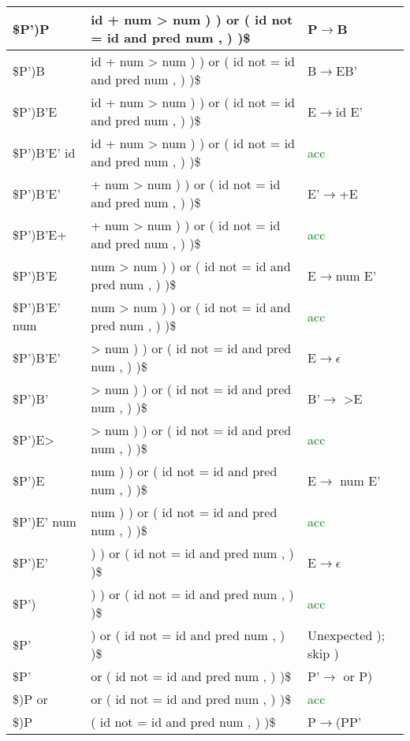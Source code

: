 \documentclass[11pt, a4paper]{article}
\begin{document}
\begin{table}[!ht]
\begin{tabular}{|l|l|l|}
        \$P')P & id + num > num ) ) or ( id not = id and pred num , ) )\$ & P$\rightarrow$B \\ \hline
        \$P')B & id + num > num ) ) or ( id not = id and pred num , ) )\$ & B$\rightarrow$EB' \\ \hline
        \$P')B'E & id + num > num ) ) or ( id not = id and pred num , ) )\$ & E$\rightarrow$id E' \\ \hline
        \$P')B'E' id & id + num > num ) ) or ( id not = id and pred num , ) )\$ & \textcolor{green}{acc} \\ \hline
        \$P')B'E' & + num > num ) ) or ( id not = id and pred num , ) )\$ & E'$\rightarrow$+E \\ \hline
        \$P')B'E+ & + num > num ) ) or ( id not = id and pred num , ) )\$ & \textcolor{green}{acc} \\ \hline
        \$P')B'E & num > num ) ) or ( id not = id and pred num , ) )\$ & E$\rightarrow$num E' \\ \hline
        \$P')B'E' num & num > num ) ) or ( id not = id and pred num , ) )\$ & \textcolor{green}{acc} \\ \hline
        \$P')B'E' & > num ) ) or ( id not = id and pred num , ) )\$ & E$\rightarrow$$\epsilon$ \\ \hline
        \$P')B' & > num ) ) or ( id not = id and pred num , ) )\$ & B'$\rightarrow$ >E \\ \hline
        \$P')E> & > num ) ) or ( id not = id and pred num , ) )\$ & \textcolor{green}{acc} \\ \hline
        \$P')E & num ) ) or ( id not = id and pred num , ) )\$ & E$\rightarrow$ num E' \\ \hline
        \$P')E' num & num ) ) or ( id not = id and pred num , ) )\$ & \textcolor{green}{acc} \\ \hline
        \$P')E' & ) ) or ( id not = id and pred num , ) )\$ & E$\rightarrow$$\epsilon$ \\ \hline
        \$P') & ) ) or ( id not = id and pred num , ) )\$ & \textcolor{green}{acc} \\ \hline
        \$P' & ) or ( id not = id and pred num , ) )\$ & Unexpected ); skip ) \\ \hline
        \$P' & or ( id not = id and pred num , ) )\$ & P'$\rightarrow$ or P) \\ \hline
        \$)P or & or ( id not = id and pred num , ) )\$ & \textcolor{green}{acc} \\ \hline
        \$)P & ( id not = id and pred num , ) )\$ & P$\rightarrow$(PP' \\ \hline

\end{tabular}
\end{table}
\end{document}
